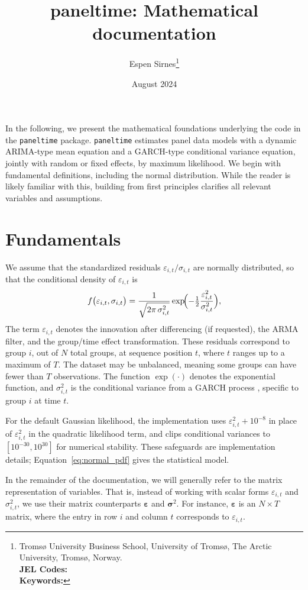 \documentclass[12pt]{article}
\title{paneltime: Mathematical documentation}
\author{
  Espen Sirnes\thanks{Tromsø University Business School, University of Tromsø, The Arctic University, Tromsø, Norway.\\
\textbf{JEL Codes:}  \\
\textbf{Keywords:} 
  }
 

}
\date{August 2024}
\begin{document}
\onehalfspacing

\maketitle

In the following, we present the mathematical foundations underlying the code in the \texttt{paneltime} package. \texttt{paneltime} estimates panel data models with a dynamic ARIMA-type mean equation and a GARCH-type conditional variance equation, jointly with random or fixed effects, by maximum likelihood. We begin with fundamental definitions, including the normal distribution. While the reader is likely familiar with this, building from first principles clarifies all relevant variables and assumptions.

\section{Fundamentals}\label{the-ll}

We assume that the standardized residuals $\varepsilon_{i,t}/\sigma_{i,t}$ are normally distributed, so that the conditional density of $\varepsilon_{i,t}$ is
\begin{equation}
f\bigl(\varepsilon_{i,t}, \sigma_{i,t}\bigr)
= \frac{1}{\sqrt{2\pi \,\sigma_{i,t}^{2}}}
  \exp\!\Bigl(- \tfrac{1}{2}
      \frac{\varepsilon_{i,t}^{2}}{\sigma_{i,t}^{2}}\Bigr),
\label{eq:normal_pdf}
\end{equation}
The term $\varepsilon_{i,t}$ denotes the innovation after differencing (if requested), the ARMA filter, and the group/time effect transformation. These residuals correspond to group $i$, out of $N$ total groups, at sequence position $t$, where $t$ ranges up to a maximum of $T$. The dataset may be unbalanced, meaning some groups can have fewer than $T$ observations. The function $\exp(\cdot)$ denotes the exponential function, and $\sigma_{i,t}^{2}$ is the conditional variance from a GARCH process \citep{engle1982autoregressive,bollerslev1986generalized}, specific to group $i$ at time $t$.

For the default Gaussian likelihood, the implementation uses $\varepsilon_{i,t}^{2}+10^{-8}$ in place of $\varepsilon_{i,t}^{2}$ in the quadratic likelihood term, and clips conditional variances to $[10^{-30},10^{30}]$ for numerical stability. These safeguards are implementation details; Equation~\ref{eq:normal_pdf} gives the statistical model.

In the remainder of the documentation, we will generally refer to the matrix representation of variables. That is, instead of working with scalar forms $\varepsilon_{i,t}$ and $\sigma_{i,t}^{2}$, we use their matrix counterparts $\mathbf{\varepsilon}$ and $\boldsymbol{\sigma}^{2}$. For instance, $\mathbf{\varepsilon}$ is an $N \times T$ matrix, where the entry in row $i$ and column $t$ corresponds to $\varepsilon_{i,t}$.
\end{document}
